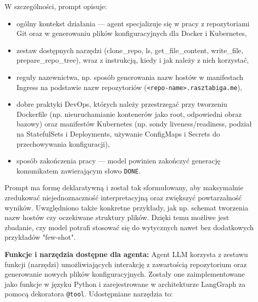 W szczególności, prompt opisuje:
\begin{itemize}
    \item ogólny kontekst działania — agent specjalizuje się w pracy z repozytoriami Git oraz w generowaniu plików konfiguracyjnych dla Docker i Kubernetes,
    \item zestaw dostępnych narzędzi (clone\_repo, ls, get\_file\_content, write\_file, prepare\_repo\_tree), wraz z instrukcją, kiedy i jak należy z nich korzystać,
    \item reguły nazewnictwa, np. sposób generowania nazw hostów w manifestach Ingress na podstawie nazw repozytoriów (\texttt{<repo-name>.rasztabiga.me}),
    \item dobre praktyki DevOps, których należy przestrzegać przy tworzeniu Dockerfile (np. nieuruchamianie kontenerów jako root, odpowiedni obraz bazowy) oraz manifestów Kubernetes (np. sondy liveness/readiness, podział na StatefulSets i Deployments, używanie ConfigMaps i Secrets do przechowywania konfiguracji),
    \item sposób zakończenia pracy — model powinien zakończyć generację komunikatem zawierającym słowo \texttt{DONE}.
\end{itemize}

Prompt ma formę deklaratywną i został tak sformułowany, aby maksymalnie zredukować niejednoznaczność interpretacyjną oraz zwiększyć powtarzalność wyników. Uwzględniono także konkretne przykłady, jak np. schemat tworzenia nazw hostów czy oczekiwane struktury plików. Dzięki temu możliwe jest zbadanie, czy model potrafi stosować się do wytycznych nawet bez dodatkowych przykładów "few-shot".

\bigskip
\noindent
\textbf{Funkcje i narzędzia dostępne dla agenta:}  
Agent LLM korzysta z zestawu funkcji (narzędzi) umożliwiających interakcję z zawartością repozytorium oraz generowanie nowych plików konfiguracyjnych. Zostały one zaimplementowane jako funkcje w języku Python i zarejestrowane w architekturze LangGraph za pomocą dekoratora \texttt{@tool}. Udostępniane narzędzia to:

